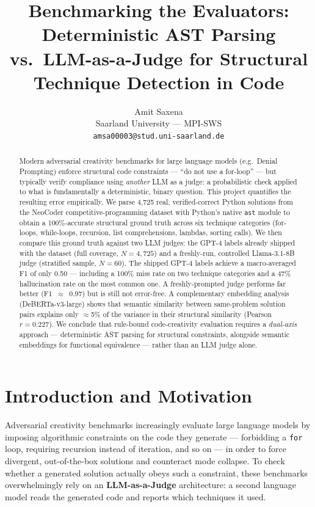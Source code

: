 \documentclass{article}
\title{Benchmarking the Evaluators: Deterministic AST Parsing vs.\
LLM-as-a-Judge for Structural Technique Detection in Code}
\author{%
  Amit Saxena \\
  Saarland University --- MPI-SWS \\
  \texttt{amsa00003@stud.uni-saarland.de}
}
\begin{document}
\maketitle

\begin{abstract}
Modern adversarial creativity benchmarks for large language models (e.g.\
Denial Prompting) enforce structural code constraints --- ``do not use a
for-loop'' --- but typically verify compliance using \emph{another} LLM as a
judge: a probabilistic check applied to what is fundamentally a deterministic,
binary question. This project quantifies the resulting error empirically. We
parse 4{,}725 real, verified-correct Python solutions from the NeoCoder
competitive-programming dataset with Python's native \texttt{ast} module to
obtain a 100\%-accurate structural ground truth across six technique
categories (for-loops, while-loops, recursion, list comprehensions, lambdas,
sorting calls). We then compare this ground truth against two LLM judges: the
GPT-4 labels already shipped with the dataset (full coverage, $N=4{,}725$) and
a freshly-run, controlled Llama-3.1-8B judge (stratified sample, $N=60$). The
shipped GPT-4 labels achieve a macro-averaged F1 of only 0.50 --- including a
100\% miss rate on two technique categories and a 47\% hallucination rate on
the most common one. A freshly-prompted judge performs far better
(F1~$\approx$~0.97) but is still not error-free. A complementary embedding
analysis (DeBERTa-v3-large) shows that semantic similarity between
same-problem solution pairs explains only $\approx$5\% of the variance in
their structural similarity (Pearson $r = 0.227$). We conclude that
rule-bound code-creativity evaluation requires a \emph{dual-axis} approach ---
deterministic AST parsing for structural constraints, alongside semantic
embeddings for functional equivalence --- rather than an LLM judge alone.
\end{abstract}

\tableofcontents

\section{Introduction and Motivation}

Adversarial creativity benchmarks increasingly evaluate large language models
by imposing algorithmic constraints on the code they generate --- forbidding a
\texttt{for} loop, requiring recursion instead of iteration, and so on --- in
order to force divergent, out-of-the-box solutions and counteract mode
collapse. To check whether a generated solution actually obeys such a
constraint, these benchmarks overwhelmingly rely on an \textbf{LLM-as-a-Judge}
architecture: a second language model reads the generated code and reports
which techniques it used.
\end{document}

